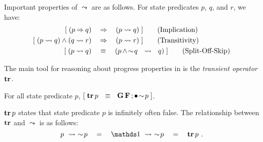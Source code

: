 Important properties of $\leadsto$ are as follows. For state
predicates $p$, $q$, and $r$, we have:
\begin{align}
  \ew{ (p \limp q) \WIDE{&\limp} (p \leadsto q)
  }\tag{Implication}\label{eq:implication} \\
  \ew{ (p \leadsto q) \land (q \leadsto r) \WIDE{&\limp} (p \leadsto r)
  }\tag{Transitivity}\label{eq:transitivity}
  \\
  \label{eq:37} 
  \ew{ (p \leadsto q)  \WIDE{&\eqv}  (p \,\land \! \spneg q \Wide{\leadsto} q)
  }\tag{Split-Off-Skip}
\end{align}

The main tool for reasoning about progress properties in \unitb is the \emph{transient operator} $\tr$. 
\begin{Definition}[$\tr$ operator] For all state predicate $p$, $[\; \mathop{\textbf{tr}} p ~~\equiv~~ \mathbf{G}\, \mathbf{F} \, ;\bullet\! \sim \! p \;]$.
\end{Definition}
$\mathop{\textbf{tr}} p$ states that state predicate $p$ is infinitely often false.
The relationship between $\tr$ and $\leadsto$
is as follows:
\begin{equation}
  p \wide{\leadsto} \spneg p  \WIDE{=} \one \wide{\leadsto} \spneg p \WIDE{=}
  \tr p~.
  \label{eq:trans-prop}
\end{equation}

